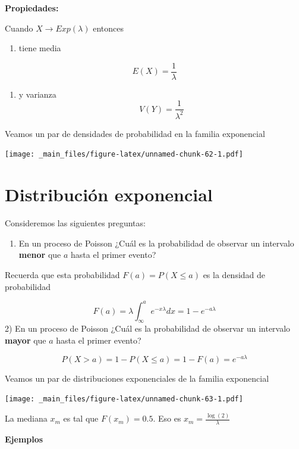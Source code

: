 \documentclass[
]{book}
\providecommand{\tightlist}{%
  \setlength{\itemsep}{0pt}\setlength{\parskip}{0pt}}
\begin{document}
\textbf{Propiedades:}

Cuando \(X \rightarrow Exp(\lambda)\) entonces

\begin{enumerate}
\def\labelenumi{\arabic{enumi})}
\tightlist
\item
  tiene media
\end{enumerate}

\[E(X)=\frac{1}{\lambda}\]

\begin{enumerate}
\def\labelenumi{\arabic{enumi})}
\setcounter{enumi}{1}
\tightlist
\item
  y varianza
  \[V(Y)=\frac{1}{\lambda^2}\]
\end{enumerate}

Veamos un par de densidades de probabilidad en la familia exponencial

\texttt{[image: \_main\_files/figure-latex/unnamed-chunk-62-1.pdf]}

\hypertarget{distribuciuxf3n-exponencial}{%
\section{Distribución exponencial}\label{distribuciuxf3n-exponencial}}

Consideremos las siguientes preguntas:

\begin{enumerate}
\def\labelenumi{\arabic{enumi})}
\tightlist
\item
  En un proceso de Poisson ¿Cuál es la probabilidad de observar un intervalo \textbf{menor} que \(a\) hasta el primer evento?
\end{enumerate}

Recuerda que esta probabilidad \(F(a)=P(X \leq a)\) es la densidad de probabilidad

\[F(a)=\lambda\int_\infty^ae^{-x\lambda}dx=1-e^{-a\lambda}\]
2) En un proceso de Poisson ¿Cuál es la probabilidad de observar un intervalo \textbf{mayor} que \(a\) hasta el primer evento?

\[P(X > a)=1- P(X \leq a)= 1- F(a) = e^{-a\lambda}\]

Veamos un par de distribuciones exponenciales de la familia exponencial

\texttt{[image: \_main\_files/figure-latex/unnamed-chunk-63-1.pdf]}

La mediana \(x_m\) es tal que \(F(x_m)=0.5\). Eso es \(x_m=\frac{\log(2)}{\lambda}\)

\textbf{Ejemplos}
\end{document}
